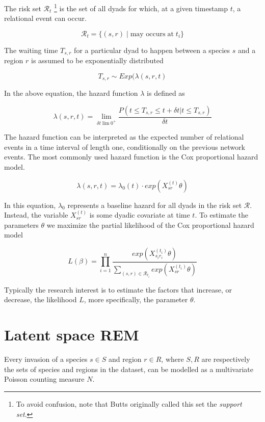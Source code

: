 \documentclass[mscthesis]{usiinfthesis}
\begin{document}
The risk set $\mathcal{R}_t$ \footnote{To avoid confusion, note that Butts originally called this set the \textit{support set}.} is the set of all dyads for which, at a given timestamp $t$, a relational event can occur.

\[
\mathcal{R}_{t} = \{(s,r) \; | \; \textrm{may occurs} \; \textrm{at} \; t_i\}
\]

The waiting time $T_{s,r}$ for a particular dyad to happen between a species $s$ and a region $r$ is assumed to be exponentially distributed 

\[
T_{s,r} \sim Exp(\lambda(s, r, t)
\]


In the above equation, the hazard function $\lambda$ is defined as

\[
\lambda(s, r, t) = \lim_{\delta t \lim 0^+} \frac{P(t \leq T_{s,r} \leq t + \delta t | t \leq T_{s,r})}{\delta t}
\]

The hazard function can be interpreted as the expected number of relational events in a time interval of length one, conditionally on the previous network events. The most commonly used hazard function is the Cox proportional hazard model. 


\[
\lambda(s, r, t) = \lambda_0(t) \cdot exp({X_{sr}^{(t)} \theta} )
\]

In this equation, $\lambda_0$ represents a baseline hazard for all dyads in the risk set $\mathcal{R}$. Instead, the variable $X_{sr}^{(t)}$ is some dyadic covariate at time $t$. To estimate the parameters $\theta$ we maximize the partial likelihood of the Cox proportional hazard model 


\[
L(\beta) =  \prod_{i=1}^n \frac{exp (X_{s_i r_i}^{(t_i)} \theta) }{ \sum_{(s,r) \in \mathcal{R}_{t_i}} exp({X_{sr}^{(t_i)} \theta} )}
\]

Typically the research interest is to estimate the factors that increase, or decrease, the likelihood $L$, more specifically, the parameter $\theta$.



\section{Latent space REM}
 

Every invasion of a species $s \in S$ and region $r \in R$, where $S, R$ are respectively the sets of species and regions in the dataset, can be modelled as a multivariate Poisson counting measure  $N$.
\end{document}
